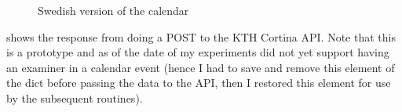\begin{figure}[!ht]
  \begin{center}
  \end{center}
  \caption{Swedish version of the calendar}
  \label{fig:cortinaPicture3}
\end{figure}
\FloatBarrier

 shows the response from doing a POST to the KTH Cortina API. Note that this is a prototype and as of the date of my experiments did not yet support having an examiner in a calendar event (hence I had to save and remove this element of the dict before passing the data to the API, then I restored this element for use by the subsequent routines).

